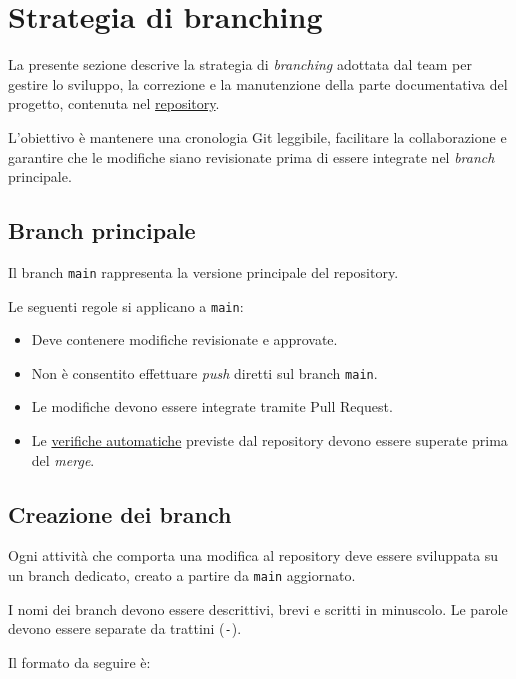 \documentclass[11pt, a4paper]{article}
\begin{document}
\section{Strategia di branching}
\label{sec:strategia-di-branching}

La presente sezione descrive la strategia di \textit{branching} adottata dal team per gestire lo sviluppo, la correzione e la manutenzione della parte documentativa del progetto, contenuta nel \href{https://github.com/On-By-One-Team/On-By-One.github.io}{repository}.

L'obiettivo è mantenere una cronologia Git leggibile, facilitare la collaborazione e garantire che le modifiche siano revisionate prima di essere integrate nel \textit{branch} principale.

\subsection{Branch principale}

Il branch \texttt{main} rappresenta la versione principale del repository.

Le seguenti regole si applicano a \texttt{main}:
\begin{itemize}
    \item Deve contenere modifiche revisionate e approvate.
    \item Non è consentito effettuare \textit{push} diretti sul branch \texttt{main}.
    \item Le modifiche devono essere integrate tramite Pull Request.
    \item Le \href{https://github.com/On-By-One-Team/On-By-One.github.io/tree/main/.github/workflows}{verifiche automatiche} previste dal repository devono essere superate prima del \textit{merge}.
\end{itemize}

\subsection{Creazione dei branch}
\label{subsec:creazione-dei-branch}

Ogni attività che comporta una modifica al repository deve essere sviluppata su un branch dedicato, creato a partire da \texttt{main} aggiornato.

I nomi dei branch devono essere descrittivi, brevi e scritti in minuscolo. Le parole devono essere separate da trattini (\texttt{-}).

Il formato da seguire è:
\end{document}

